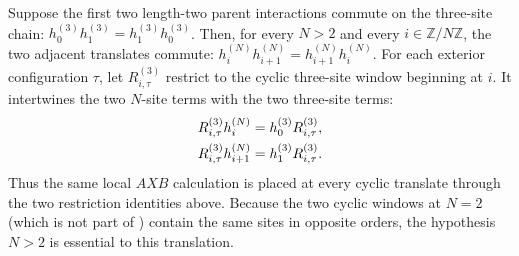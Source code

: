 \begin{lemma}
    \label{thm:three_site_commutator_chain_transport}
    \leanok
    Suppose the first two length-two parent interactions commute on the
    three-site chain:
    $h_0^{(3)}h_1^{(3)} =h_1^{(3)}h_0^{(3)}$.
    Then, for every $N>2$ and every $i\in\mathbb Z/N\mathbb Z$, the two
    adjacent translates commute:
    $h_i^{(N)}h_{i+1}^{(N)} =h_{i+1}^{(N)}h_i^{(N)}$.
    For each exterior configuration $\tau$, let $R_{i,\tau}^{(3)}$ restrict to
    the cyclic three-site window beginning at $i$. It intertwines the two
    $N$-site terms with the two three-site terms:
    \begin{align}
        R_{i,\tau}^{(3)}h_i^{(N)}
         & =h_0^{(3)}R_{i,\tau}^{(3)},
        \notag                         \\
        R_{i,\tau}^{(3)}h_{i+1}^{(N)}
         & =h_1^{(3)}R_{i,\tau}^{(3)}.
        \notag
    \end{align}
    Thus the same local $A\!X\!B$ calculation is placed at every cyclic
    translate through the two restriction identities above.
    Because the two cyclic windows at $N=2$ (which is not part of
    \cite[Theorem~3.10]{Cirac2016MPDO_arXiv}) contain the same sites in
    opposite orders, the hypothesis $N>2$ is essential to this translation.
\end{lemma}

